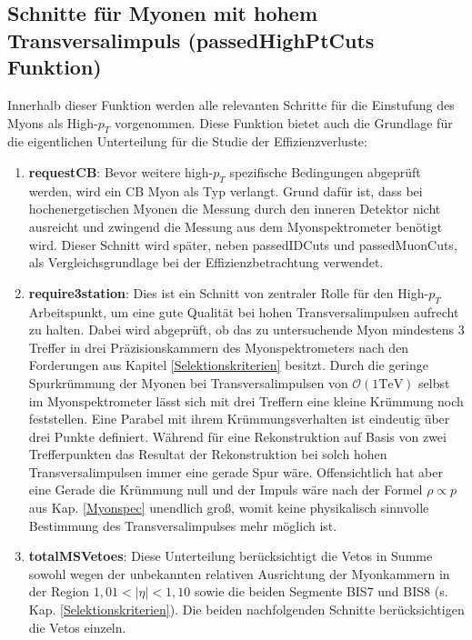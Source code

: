 \subsection{Schnitte für Myonen mit hohem Transversalimpuls (passedHighPtCuts Funktion)}\label{passedHighPtCuts Funktion}%
Innerhalb dieser Funktion werden alle relevanten Schritte für die Einstufung des Myons als High-$p_{T}$ vorgenommen. 
Diese Funktion bietet auch die Grundlage für die eigentlichen Unterteilung für die Studie der Effizienzverluste:
\begin{enumerate}
\renewcommand\labelenumi{\bfseries\theenumi}%
  \item \textbf{requestCB}: Bevor weitere high-$p_{T}$ spezifische Bedingungen abgeprüft werden, wird ein CB Myon als Typ verlangt. Grund dafür ist, dass bei hochenergetischen Myonen die Messung durch den inneren Detektor nicht ausreicht und zwingend die Messung aus dem Myonspektrometer benötigt wird. Dieser Schnitt wird später, neben passedIDCuts und passedMuonCuts, als Vergleichsgrundlage bei der Effizienzbetrachtung verwendet. 
  \item \textbf{require3station}: Dies ist ein Schnitt von zentraler Rolle für den High-$p_{T}$ Arbeitspunkt, um eine gute Qualität bei hohen Transversalimpulsen aufrecht zu halten. Dabei wird abgeprüft, ob das zu untersuchende Myon mindestens 3 Treffer in drei Präzisionskammern des Myonspektrometers nach den Forderungen aus Kapitel \ref{Selektionskriterien} besitzt. Durch die geringe Spurkrümmung der Myonen bei Transversalimpulsen von $\mathcal{O}(1\text{TeV})$ selbst im Myonspektrometer lässt sich mit drei Treffern eine kleine Krümmung noch feststellen. Eine Parabel mit ihrem Krümmungsverhalten ist eindeutig über drei Punkte definiert. Während für eine Rekonstruktion auf Basis von zwei Trefferpunkten das Resultat der Rekonstruktion bei solch hohen Transversalimpulsen immer eine gerade Spur wäre. Offensichtlich hat aber eine Gerade die Krümmung null und der Impuls wäre nach der Formel $\rho\propto p$ aus Kap. \ref{Myonspec} unendlich groß, womit keine physikalisch sinnvolle Bestimmung des Transversalimpulses mehr möglich ist.  
  \item \textbf{totalMSVetoes}: Diese Unterteilung berücksichtigt die Vetos in Summe sowohl wegen der unbekannten relativen Ausrichtung der Myonkammern in der Region $1{,}01<|\eta|<1{,}10$ sowie die beiden Segmente BIS7 und BIS8 (s. Kap. \ref{Selektionskriterien}). Die beiden nachfolgenden Schnitte berücksichtigen die Vetos einzeln. 

\end{enumerate}

